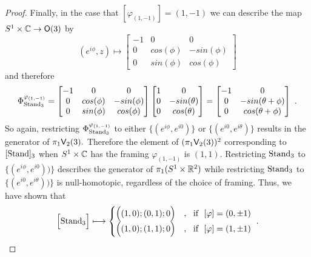 \begin{proof}
Finally, in the case that $[\varphi_{( 1, -1)}] = ( 1, -1)$ we can describe the map $S^{1} \times \mathbb C \rightarrow \mathsf O(3)$ by
\[
(e^{i\phi}, z)
\longmapsto
\begin{bmatrix}
-1 & 0 & 0\\
0 & cos(\phi) & -sin(\phi)\\
0 & sin(\phi) & cos(\phi)
\end{bmatrix}
\]
and therefore 
\[
\Phi^{\varphi_{( 1, -1)}}_{\rm Stand_{3}} = \begin{bmatrix}
-1 & 0 & 0\\
0 & cos(\phi) & -sin(\phi)\\
0 & sin(\phi) & cos(\phi)
\end{bmatrix}
\begin{bmatrix} 1 & 0 \\ 0 & -sin(\theta) \\ 0 & cos(\theta) \end{bmatrix} =
\begin{bmatrix} -1 & 0 \\ 0 & -sin(\theta + \phi) \\ 0 & cos(\theta + \phi) \end{bmatrix} ~.
\]
So again, restricting $\Phi^{\varphi_{( 1, -1)}}_{\rm Stand_{3}}$ to either $\{(e^{i\phi}, e^{i0})\}$ or $\{(e^{i0}, e^{i\theta})\}$ results in the generator of $\pi_{1}\mathsf V_{2}(3).$ Therefore the element of $(\pi_{1}\mathsf V_{2}(3))^{2}$ corresponding to $[\rm Stand]_{3}$ when $S^{1} \times \mathbb C$ has the framing $\varphi_{( 1, -1)}$ is $(1, 1).$ Restricting ${\rm Stand}_{3}$ to  $\{(e^{i\phi}, e^{i0}))\}$ describes the generator of $\pi_{1}(S^1 \times \mathbb R^{2})$ while restricting  ${\rm Stand}_{3}$ to  $\{(e^{i0}, e^{i\theta}))\}$ is null-homotopic, regardless of the choice of framing. Thus, we have shown that
\[
\Bigl[
{\rm Stand}_{3}
\Bigr]
\longmapsto
\begin{cases}
\Bigl(
(1,0) ; (0,1) ; 0
\Bigr)
&
,
~
\text{ if }~[\varphi] = ( 0,\pm 1)
\\
\Bigl(
(1,0) ; (1,1) ; 0
\Bigr)
&
,
~
\text{ if }~[\varphi] = (1,\pm 1)
\end{cases}~.
\]


\end{proof}
